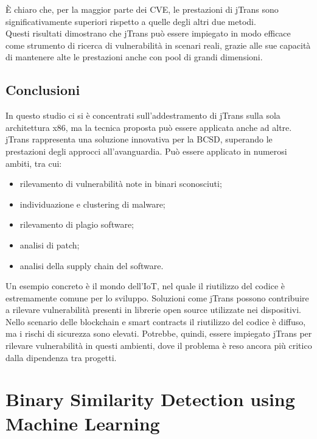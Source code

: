 \documentclass[12pt,a4paper,openright,twoside]{report}
\begin{document}
È chiaro che, per la maggior parte dei CVE, le prestazioni di jTrans sono significativamente superiori rispetto a quelle degli altri due metodi.\\
Questi risultati dimostrano che jTrans può essere impiegato in modo efficace come strumento di ricerca di vulnerabilità in scenari reali, grazie alle sue capacità di mantenere alte le prestazioni anche con pool di grandi dimensioni.

\subsection{Conclusioni}

In questo studio ci si è concentrati sull'addestramento di jTrans sulla sola architettura x86, ma la tecnica proposta può essere applicata anche ad altre.\\
jTrans rappresenta una soluzione innovativa per la BCSD, superando le prestazioni degli approcci all'avanguardia. Può essere applicato in numerosi ambiti, tra cui:
\begin{itemize}
    \item rilevamento di vulnerabilità note in binari sconosciuti;
    \item individuazione e clustering di malware;
    \item rilevamento di plagio software;
    \item analisi di patch;
    \item analisi della supply chain del software.
\end{itemize}
Un esempio concreto è il mondo dell'IoT, nel quale il riutilizzo del codice è estremamente comune per lo sviluppo. Soluzioni come jTrans possono contribuire a rilevare vulnerabilità presenti in librerie open source utilizzate nei dispositivi.\\
Nello scenario delle blockchain e smart contracts il riutilizzo del codice è diffuso, ma i rischi di sicurezza sono elevati. Potrebbe, quindi, essere impiegato jTrans per rilevare vulnerabilità in questi ambienti, dove il problema è reso ancora più critico dalla dipendenza tra progetti.\\


\section{Binary Similarity Detection using Machine Learning}
\end{document}
